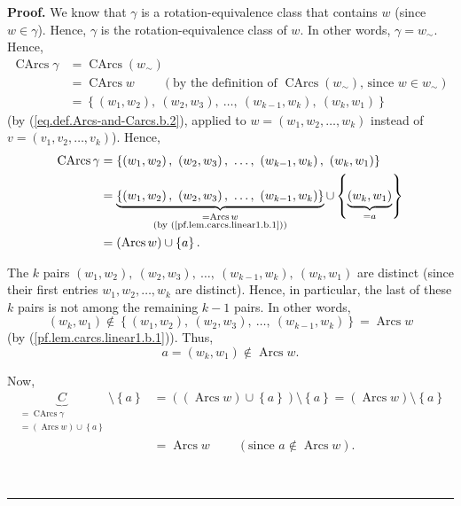 \documentclass[numbers=enddot,12pt,final,onecolumn,notitlepage]{scrartcl}%
\numberwithin{exer}{section}
\theoremstyle{definition}
\newenvironment{proof}[1][Proof]{\noindent\textbf{#1.} }{\ \rule{0.5em}{0.5em}}
\newenvironment{verlong}{}{}
\begin{document}
\begin{verlong}
\begin{proof}
We know that $\gamma$ is a rotation-equivalence class that contains $w$ (since
$w\in\gamma$). Hence, $\gamma$ is the rotation-equivalence class of $w$. In
other words, $\gamma=w_{\sim}$. Hence,
\begin{align*}
\operatorname*{CArcs}\gamma &  =\operatorname*{CArcs}\left(  w_{\sim}\right)
\\
&  =\operatorname*{CArcs}w\ \ \ \ \ \ \ \ \ \ \left(  \text{by the definition
of }\operatorname*{CArcs}\left(  w_{\sim}\right)  \text{, since }w\in w_{\sim
}\right) \\
&  =\left\{  \left(  w_{1},w_{2}\right)  ,\ \left(  w_{2},w_{3}\right)
,\ \ldots,\ \left(  w_{k-1},w_{k}\right)  ,\ \left(  w_{k},w_{1}\right)
\right\}
\end{align*}
(by (\ref{eq.def.Arcs-and-Carcs.b.2}), applied to $w=\left(  w_{1}%
,w_{2},\ldots,w_{k}\right)  $ instead of $v=\left(  v_{1},v_{2},\ldots
,v_{k}\right)  $). Hence,%
\begin{align*}
\operatorname*{CArcs}\gamma &  =\left\{  \left(  w_{1},w_{2}\right)
,\ \left(  w_{2},w_{3}\right)  ,\ \ldots,\ \left(  w_{k-1},w_{k}\right)
,\ \left(  w_{k},w_{1}\right)  \right\} \\
&  =\underbrace{\left\{  \left(  w_{1},w_{2}\right)  ,\ \left(  w_{2}%
,w_{3}\right)  ,\ \ldots,\ \left(  w_{k-1},w_{k}\right)  \right\}
}_{\substack{=\operatorname*{Arcs}w\\\text{(by (\ref{pf.lem.carcs.linear1.b.1}%
))}}}\cup\left\{  \underbrace{\left(  w_{k},w_{1}\right)  }_{=a}\right\} \\
&  =\left(  \operatorname*{Arcs}w\right)  \cup\left\{  a\right\}  .
\end{align*}


The $k$ pairs $\left(  w_{1},w_{2}\right)  ,\ \left(  w_{2},w_{3}\right)
,\ \ldots,\ \left(  w_{k-1},w_{k}\right)  ,\ \left(  w_{k},w_{1}\right)  $ are
distinct (since their first entries $w_{1},w_{2},\ldots,w_{k}$ are distinct).
Hence, in particular, the last of these $k$ pairs is not among the remaining
$k-1$ pairs. In other words,
\[
\left(  w_{k},w_{1}\right)  \notin\left\{  \left(  w_{1},w_{2}\right)
,\ \left(  w_{2},w_{3}\right)  ,\ \ldots,\ \left(  w_{k-1},w_{k}\right)
\right\}  =\operatorname*{Arcs}w
\]
(by (\ref{pf.lem.carcs.linear1.b.1})). Thus,%
\[
a=\left(  w_{k},w_{1}\right)  \notin\operatorname*{Arcs}w.
\]


Now,%
\begin{align*}
\underbrace{C}_{\substack{=\operatorname*{CArcs}\gamma\\=\left(
\operatorname*{Arcs}w\right)  \cup\left\{  a\right\}  }}\setminus\left\{
a\right\}   &  =\left(  \left(  \operatorname*{Arcs}w\right)  \cup\left\{
a\right\}  \right)  \setminus\left\{  a\right\}  =\left(  \operatorname*{Arcs}%
w\right)  \setminus\left\{  a\right\} \\
&  =\operatorname*{Arcs}w\ \ \ \ \ \ \ \ \ \ \left(  \text{since }%
a\notin\operatorname*{Arcs}w\right)  .
\end{align*}



\end{proof}
\end{verlong}
\end{document}
